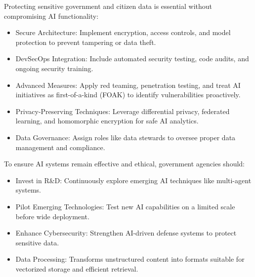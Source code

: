 
Protecting sensitive government and citizen data is essential without compromising AI functionality:

\begin{itemize}

\item Secure Architecture: Implement encryption, access controls, and model protection to prevent tampering or data theft.

\item DevSecOps Integration: Include automated security testing, code audits, and ongoing security training.

\item Advanced Measures: Apply red teaming, penetration testing, and treat AI initiatives as first-of-a-kind (FOAK) to identify vulnerabilities proactively.

\item Privacy-Preserving Techniques: Leverage differential privacy, federated learning, and homomorphic encryption for safe AI analytics.

\item Data Governance: Assign roles like data stewards to oversee proper data management and compliance.

\end{itemize}


To ensure AI systems remain effective and ethical, government agencies should:

\begin{itemize}

\item Invest in R\&D: Continuously explore emerging AI techniques like multi-agent systems.

\item Pilot Emerging Technologies: Test new AI capabilities on a limited scale before wide deployment.

\item Enhance Cybersecurity: Strengthen AI-driven defense systems to protect sensitive data.

\end{itemize}


\begin{itemize}

\item Data Processing: Transforms unstructured content into formats suitable for vectorized storage and efficient retrieval.

\end{itemize}

